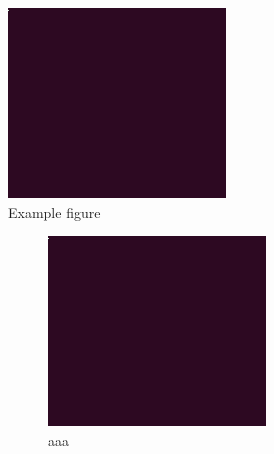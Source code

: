 \documentclass[11pt]{article}
\begin{document}
\begin{figure}[htb]
    \centering
    \includegraphics[width=.35\linewidth]{example-image.png}
    \caption{Example figure}
    \label{fig:fig}
\end{figure}

\begin{figure}
    \centering
    \begin{subfigure}[b]{0.3\textwidth}
        \centering
        \includegraphics[width=\textwidth]{example-image.png}
        \caption{aaa}
        \label{fig:subfig1}
    \end{subfigure}
    \hfill
    \begin{subfigure}[b]{0.3\textwidth}
        \centering

\end{subfigure}
\end{figure}
\end{document}
